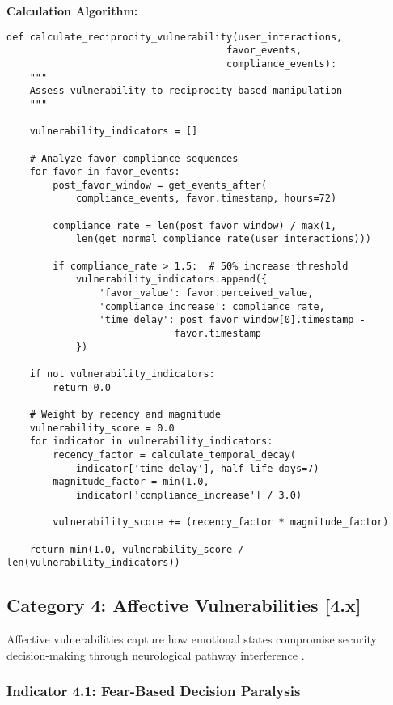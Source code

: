 \documentclass[10pt,twocolumn]{IEEEtran}
\begin{document}
\textbf{Calculation Algorithm:}
\begin{lstlisting}[caption={Reciprocity Vulnerability Assessment}]
def calculate_reciprocity_vulnerability(user_interactions, 
                                      favor_events, 
                                      compliance_events):
    """
    Assess vulnerability to reciprocity-based manipulation
    """
    
    vulnerability_indicators = []
    
    # Analyze favor-compliance sequences
    for favor in favor_events:
        post_favor_window = get_events_after(
            compliance_events, favor.timestamp, hours=72)
        
        compliance_rate = len(post_favor_window) / max(1, 
            len(get_normal_compliance_rate(user_interactions)))
        
        if compliance_rate > 1.5:  # 50% increase threshold
            vulnerability_indicators.append({
                'favor_value': favor.perceived_value,
                'compliance_increase': compliance_rate,
                'time_delay': post_favor_window[0].timestamp - 
                             favor.timestamp
            })
    
    if not vulnerability_indicators:
        return 0.0
    
    # Weight by recency and magnitude
    vulnerability_score = 0.0
    for indicator in vulnerability_indicators:
        recency_factor = calculate_temporal_decay(
            indicator['time_delay'], half_life_days=7)
        magnitude_factor = min(1.0, 
            indicator['compliance_increase'] / 3.0)
        
        vulnerability_score += (recency_factor * magnitude_factor)
    
    return min(1.0, vulnerability_score / len(vulnerability_indicators))
\end{lstlisting}

\subsection{Category 4: Affective Vulnerabilities [4.x]}

Affective vulnerabilities capture how emotional states compromise security decision-making through neurological pathway interference \cite{damasio1994}.

\subsubsection{Indicator 4.1: Fear-Based Decision Paralysis}
\end{document}
